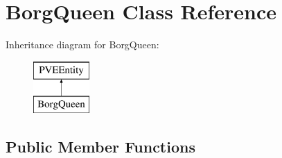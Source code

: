 \hypertarget{classBorgQueen}{
\section{BorgQueen Class Reference}
\label{d6/d8d/classBorgQueen}
}
Inheritance diagram for BorgQueen:\begin{figure}[H]
\begin{center}
\leavevmode
\includegraphics[height=2cm]{d6/d8d/classBorgQueen}
\end{center}
\end{figure}
\subsection*{Public Member Functions}
